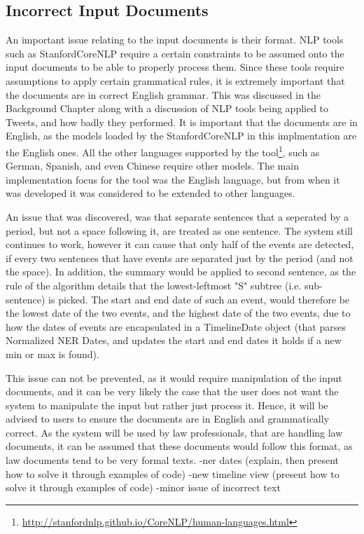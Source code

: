 \subsection{Incorrect Input Documents}
\par An important issue relating to the input documents is their format. NLP tools such as StanfordCoreNLP require a certain constraints to be assumed onto the input documents to be able to properly process them. Since these tools require assumptions to apply certain grammatical rules, it is extremely important that the documents are in correct English grammar. This was discussed in the Background Chapter along with a discussion of NLP tools being applied to Tweets, and how badly they performed. It is important that the documents are in English, as the models loaded by the StanfordCoreNLP in this implmentation are the English ones. All the other languages supported by the tool\footnote{\url{http://stanfordnlp.github.io/CoreNLP/human-languages.html}}, such as German, Spanish, and even Chinese require other models. The main implementation focus for the tool was the English language, but from when it was developed it was considered to be extended to other languages.
\par An issue that was discovered, was that separate sentences that a seperated by a period, but not a space following it, are treated as one sentence. The system still continues to work, however it can cause that only half of the events are detected, if every two sentences that have events are separated just by the period (and not the space). In addition, the summary would be applied to second sentence, as the rule of the algorithm details that the lowest-leftmost "S" subtree (i.e. sub-sentence) is picked. The start and end date of such an event, would therefore be the lowest date of the two events, and the highest date of the two events, due to how the dates of events are encapsulated in a TimelineDate object (that parses Normalized NER Dates, and updates the start and end dates it holds if a new min or max is found).
\par This issue can not be prevented, as it would require manipulation of the input documents, and it can be very likely the case that the user does not want the system to manipulate the input but rather just process it. Hence, it will be advised to users to ensure the documents are in English and grammatically correct. As the system will be used by law professionals, that are handling law documents, it can be assumed that these documents would follow this format, as law documents tend to be very formal texts.
-ner dates (explain, then present how to solve it through examples of code)
-new timeline view (present how to solve it through examples of code)
-minor issue of incorrect text
